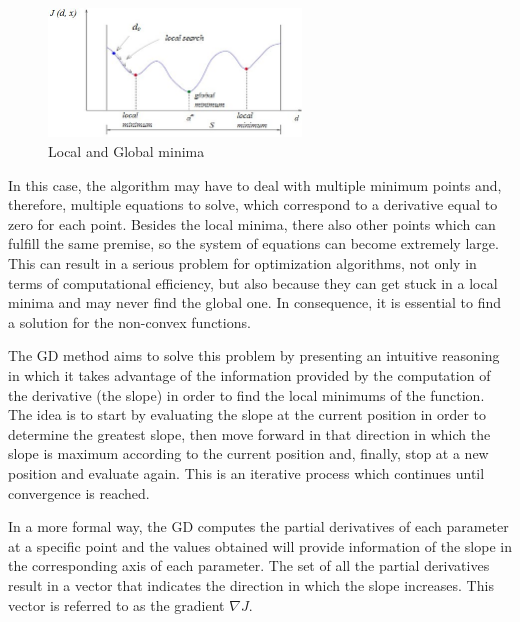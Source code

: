 \documentclass[a4paper, report, oneside, UKenglish]{memoir}
\begin{document}
\begin{figure}[hbt]
    \centering
    \includegraphics[width=0.6\textwidth]{fitting/Local-and-Global-minima_W640.jpg}
    \caption{Local and Global minima}
    \label{fig:Minimas}
\end{figure}

In this case, the algorithm may have to deal with multiple minimum points and, therefore, multiple equations to solve, which correspond to a derivative equal to zero for each point. Besides the local minima, there also other points which can fulfill the same premise, so the system of equations can become extremely large. This can result in a serious problem for optimization algorithms, not only in terms of computational efficiency, but also because they can get stuck in a local minima and may never find the global one. In consequence, it is essential to find a solution for the non-convex functions. 

The GD method aims to solve this problem by presenting an intuitive reasoning in which it takes advantage of the information provided by the computation of the derivative (the slope) in order to find the local minimums of the function. The idea is to start by evaluating the slope at the current position in order to determine the greatest slope, then move forward in that direction in which the slope is maximum according to the current position and, finally, stop at a new position and evaluate again. This is an iterative process which continues until convergence is reached. 

In a more formal way, the GD computes the partial derivatives of each parameter at a specific point and the values obtained will provide information of the slope in the corresponding axis of each parameter. The set of all the partial derivatives result in a vector that indicates the direction in which the slope increases. This vector is referred to as the gradient $\nabla J$. 
\end{document}
